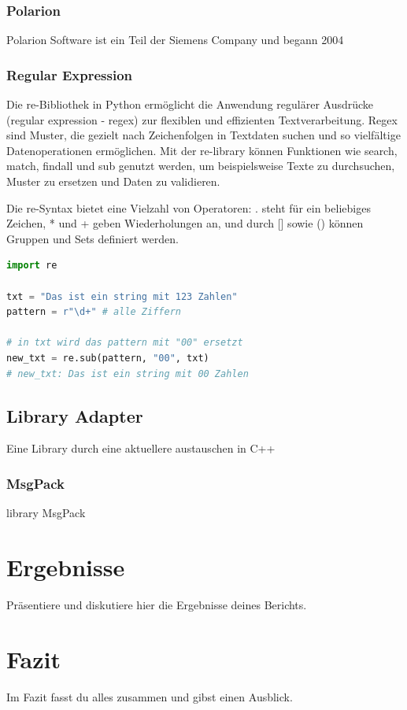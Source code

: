 \documentclass[a4paper, 12pt]{article}
\begin{document}
\subsubsection{Polarion}\label{polarion}
Polarion Software ist ein Teil der Siemens Company und begann 2004

\subsubsection{Regular Expression}\label{regularExpression}
Die re-Bibliothek in Python ermöglicht die Anwendung regulärer Ausdrücke (regular expression - regex) zur flexiblen und effizienten Textverarbeitung. Regex sind Muster, die gezielt nach Zeichenfolgen in Textdaten suchen und so vielfältige Datenoperationen ermöglichen. Mit der re-library können Funktionen wie search, match, findall und sub genutzt werden, um beispielsweise Texte zu durchsuchen, Muster zu ersetzen und Daten zu validieren.

Die re-Syntax bietet eine Vielzahl von Operatoren: . steht für ein beliebiges Zeichen, * und + geben Wiederholungen an, und durch [] sowie () können Gruppen und Sets definiert werden.

\begin{lstlisting}[language=Python, caption=Beispiel für Python-Code]
import re

txt = "Das ist ein string mit 123 Zahlen"
pattern = r"\d+" # alle Ziffern

# in txt wird das pattern mit "00" ersetzt
new_txt = re.sub(pattern, "00", txt)
# new_txt: Das ist ein string mit 00 Zahlen
\end{lstlisting} %

\subsection{Library Adapter}\label{LibraryAdapter}
Eine Library durch eine aktuellere austauschen in C++

\subsubsection{MsgPack}\label{msgpack}
library MsgPack

\newpage
\section{Ergebnisse}
Präsentiere und diskutiere hier die Ergebnisse deines Berichts.

\newpage
\section{Fazit}
Im Fazit fasst du alles zusammen und gibst einen Ausblick.

\newpage

\end{document}
